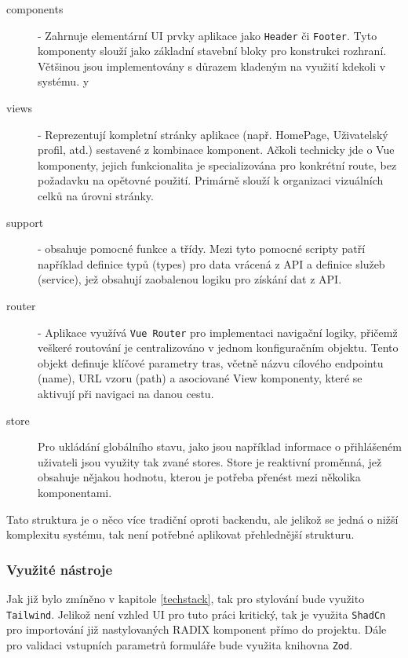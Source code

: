 \begin{description}
    \item[components] - Zahrnuje elementární UI prvky aplikace jako \texttt{Header} či \texttt{Footer}. Tyto komponenty slouží jako základní stavební bloky pro konstrukci rozhraní. Většinou jsou implementovány s důrazem kladeným na využití kdekoli v systému.
y    \item[views] - Reprezentují kompletní stránky aplikace (např. HomePage, Uživatelský profil, atd.) sestavené z kombinace komponent. Ačkoli technicky jde o Vue komponenty, jejich funkcionalita je specializována pro konkrétní route, bez požadavku na opětovné použití. Primárně slouží k organizaci vizuálních celků na úrovni stránky.
    \item[support] - obsahuje pomocné funkce a třídy. Mezi tyto pomocné scripty patří například definice typů (types) pro data vrácená z API a definice služeb (service), jež obsahují zaobalenou logiku pro získání dat z API.
    \item[router] - Aplikace využívá \texttt{Vue Router} pro implementaci navigační logiky, přičemž veškeré routování je centralizováno v jednom konfiguračním objektu. Tento objekt definuje klíčové parametry tras, včetně názvu cílového endpointu (name), URL vzoru (path) a asociované View komponenty, které se aktivují při navigaci na danou cestu.
    \item[store]
    Pro ukládání globálního stavu, jako jsou například informace o přihlášeném uživateli jsou využity tak zvané stores. Store je reaktivní proměnná, jež obsahuje nějakou hodnotu, kterou je potřeba přenést mezi několika komponentami.
\end{description}

Tato struktura je o něco více tradiční oproti backendu, ale jelikož se jedná o nižší komplexitu systému, tak není potřebné aplikovat přehlednější strukturu.

\subsubsection{Využité nástroje}
Jak již bylo zmíněno v kapitole \ref{techstack}, tak pro stylování bude využito \texttt{Tailwind}. Jelikož není vzhled UI pro tuto práci kritický, tak je využita \texttt{ShadCn} pro importování již nastylovaných RADIX komponent přímo do projektu. Dále pro validaci vstupních parametrů formuláře bude využita knihovna \texttt{Zod}.


